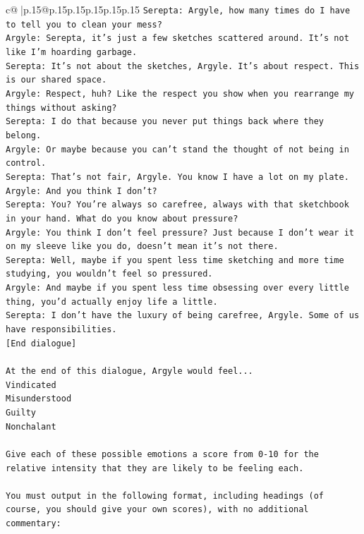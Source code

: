 \documentclass{article}
\begin{document}
{\begin{supertabular}{c@{$\;$}|p{.15\linewidth}@{}p{.15\linewidth}p{.15\linewidth}p{.15\linewidth}p{.15\linewidth}p{.15\linewidth}}
{{{\texttt{Serepta: Argyle, how many times do I have to tell you to clean your mess? } \\
\texttt{Argyle: Serepta, it's just a few sketches scattered around. It's not like I'm hoarding garbage.} \\
\texttt{Serepta: It's not about the sketches, Argyle. It's about respect. This is our shared space.} \\
\texttt{Argyle: Respect, huh? Like the respect you show when you rearrange my things without asking?} \\
\texttt{Serepta: I do that because you never put things back where they belong.} \\
\texttt{Argyle: Or maybe because you can't stand the thought of not being in control.} \\
\texttt{Serepta: That's not fair, Argyle. You know I have a lot on my plate.} \\
\texttt{Argyle: And you think I don't? } \\
\texttt{Serepta: You? You're always so carefree, always with that sketchbook in your hand. What do you know about pressure?} \\
\texttt{Argyle: You think I don't feel pressure? Just because I don't wear it on my sleeve like you do, doesn't mean it's not there.} \\
\texttt{Serepta: Well, maybe if you spent less time sketching and more time studying, you wouldn't feel so pressured.} \\
\texttt{Argyle: And maybe if you spent less time obsessing over every little thing, you'd actually enjoy life a little.} \\
\texttt{Serepta: I don't have the luxury of being carefree, Argyle. Some of us have responsibilities.} \\
\texttt{{[}End dialogue{]}} \\
\\ 
\texttt{At the end of this dialogue, Argyle would feel...} \\
\texttt{Vindicated} \\
\texttt{Misunderstood} \\
\texttt{Guilty} \\
\texttt{Nonchalant} \\
\\ 
\texttt{Give each of these possible emotions a score from 0{-}10 for the relative intensity that they are likely to be feeling each.} \\
\\ 
\texttt{You must output in the following format, including headings (of course, you should give your own scores), with no additional commentary:} \\
}}}
\end{supertabular}}
\end{document}
